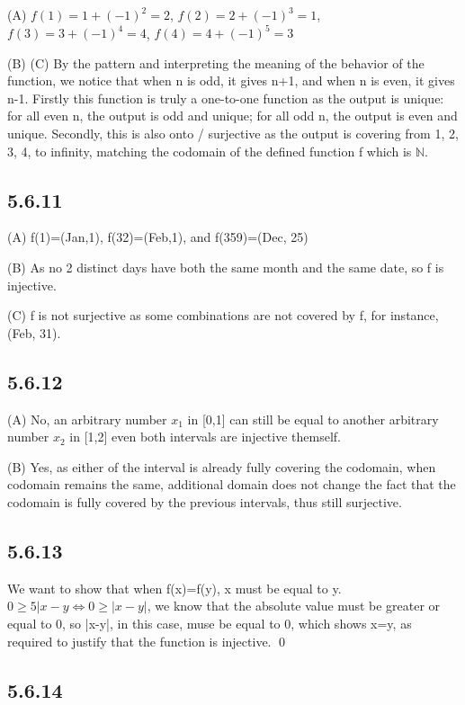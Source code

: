 \documentclass{article}
\begin{document}
(A) $f(1)=1+(-1)^2=2$, $f(2)=2+(-1)^3=1$, $f(3)=3+(-1)^4=4$, $f(4)=4+(-1)^5=3$

(B) (C) By the pattern and interpreting the meaning of the behavior of the function, we notice that when n is odd, it gives n+1, and when n is even, it gives n-1. Firstly this function is truly a one-to-one function as the output is unique: for all even n, the output is odd and unique; for all odd n, the output is even and unique. Secondly, this is also onto / surjective as the output is covering from 1, 2, 3, 4, to infinity, matching the codomain of the defined function f which is $\mathbb{N}$. 

\subsection*{5.6.11}

(A) f(1)=(Jan,1), f(32)=(Feb,1), and f(359)=(Dec, 25)

(B) As no 2 distinct days have both the same month and the same date, so f is injective.

(C) f is not surjective as some combinations are not covered by f, for instance, (Feb, 31). 

\subsection*{5.6.12}

(A) No, an arbitrary number $x_1$ in [0,1] can still be equal to another arbitrary number $x_2$ in [1,2] even both intervals are injective themself.

(B) Yes, as either of the interval is already fully covering the codomain, when codomain remains the same, additional domain does not change the fact that the codomain is fully covered by the previous intervals, thus still surjective.

\subsection*{5.6.13}

We want to show that when f(x)=f(y), x must be equal to y. $0\geq5|x-y \iff 0\geq |x-y|$, we know that the absolute value must be greater or equal to 0, so |x-y|, in this case, muse be  equal to 0, which shows x=y, as required to justify that the function is injective. \qed

\subsection*{5.6.14}
\end{document}
